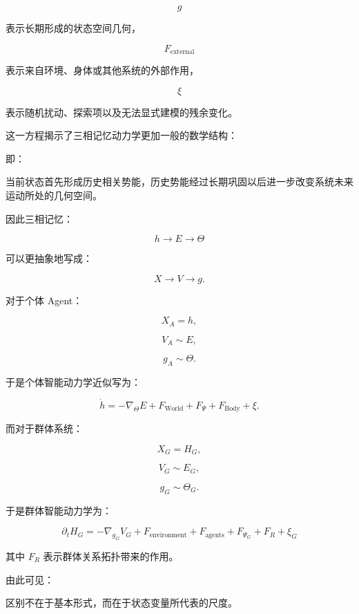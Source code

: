 \[
g
\]

表示长期形成的状态空间几何，

\[
F_{\mathrm{external}}
\]

表示来自环境、身体或其他系统的外部作用，

\[
\xi
\]

表示随机扰动、探索项以及无法显式建模的残余变化。

这一方程揭示了三相记忆动力学更加一般的数学结构：

\begin{statementbox}
\centering
{}
\end{statementbox}

即：

当前状态首先形成历史相关势能，历史势能经过长期巩固以后进一步改变系统未来运动所处的几何空间。

因此三相记忆：

\[
h
\rightarrow
E
\rightarrow
\Theta
\]

可以更抽象地写成：

\[
X
\rightarrow
V
\rightarrow
g.
\]

对于个体 Agent：

\[
X_A = h,
\]

\[
V_A \sim E,
\]

\[
g_A \sim \Theta.
\]

于是个体智能动力学近似写为：

\[
\dot h
=
-\nabla_{\Theta}E
+
F_{\mathrm{World}}
+
F_{\Psi}
+
F_{\mathrm{Body}}
+
\xi.
\]

而对于群体系统：

\[
X_G = H_G,
\]

\[
V_G \sim E_G,
\]

\[
g_G \sim \Theta_G.
\]

于是群体智能动力学为：

\[
\boxed{
\partial_t H_G
=
-\nabla_{g_G}V_G
+
F_{\mathrm{environment}}
+
F_{\mathrm{agents}}
+
F_{\Psi_G}
+
F_R
+
\xi_G
}
\]

其中 $F_R$ 表示群体关系拓扑带来的作用。

由此可见：

\begin{statementbox}
\centering
{}
\end{statementbox}

区别不在于基本形式，而在于状态变量所代表的尺度。


